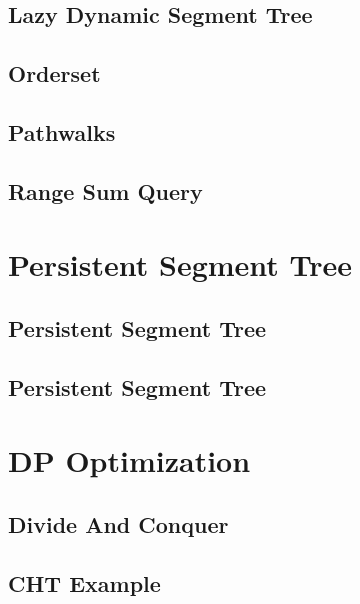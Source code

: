 \subsection{Lazy Dynamic Segment Tree}
\raggedbottom
\hrulefill
\subsection{Orderset}
\raggedbottom
\hrulefill
\subsection{Pathwalks}
\raggedbottom
\hrulefill
\subsection{Range Sum Query}
\raggedbottom
\hrulefill

\section{Persistent Segment Tree}
\subsection{Persistent Segment Tree}
\raggedbottom
\hrulefill
\subsection{Persistent Segment Tree}
\raggedbottom
\hrulefill

\section{DP Optimization}
\subsection{Divide And Conquer}
\raggedbottom
\hrulefill
\subsection{CHT Example}
\raggedbottom
\hrulefill
